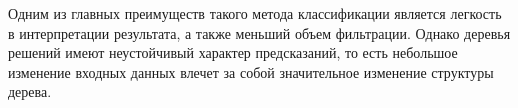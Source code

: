 Одним из главных преимуществ такого метода классификации является
легкость в интерпретации результата, а также меньший объем фильтрации.
Однако деревья решений имеют неустойчивый характер предсказаний, то есть
небольшое изменение входных данных влечет за собой значительное изменение
структуры дерева.










